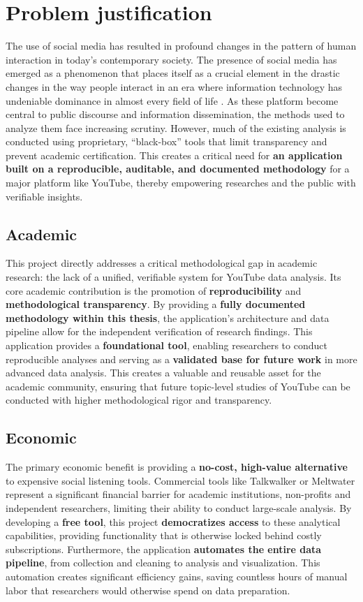\section{Problem justification}

The use of social media has resulted in profound changes in the pattern of human interaction in today's contemporary society. The presence of social media has emerged as a phenomenon that places itself as a crucial element in the drastic changes in the way people interact in an era where information technology has undeniable dominance in almost every field of life \parencite{azzaakiyyah2023impact}. As these platform become central to public discourse and information dissemination, the methods used to analyze them face increasing scrutiny. However, much of the existing analysis is conducted using proprietary, \enquote{black-box} tools that limit transparency and prevent academic certification. This creates a critical need for \textbf{an application built on a reproducible, auditable, and documented methodology} for a major platform like YouTube, thereby empowering researches and the public with verifiable insights.

\subsection{Academic}

This project directly addresses a critical methodological gap in academic research: the lack of a unified, verifiable system for YouTube data analysis. Its core academic contribution is the promotion of \textbf{reproducibility} and \textbf{methodological transparency}. By providing a \textbf{fully documented methodology within this thesis}, the application's architecture and data pipeline allow for the independent verification of research findings. This application provides a \textbf{foundational tool}, enabling researchers to conduct reproducible analyses and serving as a \textbf{validated base for future work} in more advanced data analysis. This creates a valuable and reusable asset for the academic community, ensuring that future topic-level studies of YouTube can be conducted with higher methodological rigor and transparency.

\subsection{Economic}

The primary economic benefit is providing a \textbf{no-cost, high-value alternative} to expensive social listening tools. Commercial tools like Talkwalker or Meltwater represent a significant financial barrier for academic institutions, non-profits and independent researchers, limiting their ability to conduct large-scale analysis. By developing a \textbf{free tool}, this project \textbf{democratizes access} to these analytical capabilities, providing functionality that is otherwise locked behind costly subscriptions. Furthermore, the application \textbf{automates the entire data pipeline}, from collection and cleaning to analysis and visualization. This automation creates significant efficiency gains, saving countless hours of manual labor that researchers would otherwise spend on data preparation.

